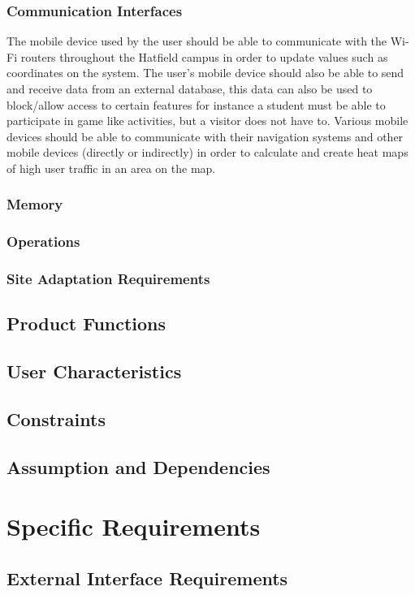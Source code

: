 \documentclass[a4paper,12pt]{article}
\begin{document}
\subsubsection{Communication Interfaces}
The mobile device used by the user should be able to communicate with the Wi-Fi routers throughout the Hatfield campus in order to update values such as coordinates on the system. The user’s mobile device should also be able to send and receive data from an external database, this data can also be used to block/allow access to certain features for instance a student must be able to participate in game like activities, but a visitor does not have to. Various mobile devices should be able to communicate with their navigation systems and other mobile devices (directly or indirectly) in order to calculate and create heat maps of high user traffic in an area on the map.\\
\subsubsection{Memory}
\subsubsection{Operations}
\subsubsection{Site Adaptation Requirements}
\subsection{Product Functions}
\subsection{User Characteristics}
\subsection{Constraints}
\subsection{Assumption and Dependencies}

\section{Specific Requirements}
\subsection{External Interface Requirements}
\end{document}

